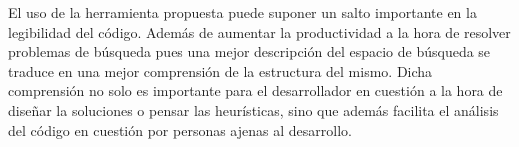 \begin{conclusions}
      El uso de la herramienta propuesta puede suponer un salto importante en la
      legibilidad del código. Además de aumentar la productividad a la hora de resolver problemas de
      búsqueda pues una mejor descripción del espacio de búsqueda se traduce en una mejor comprensión
      de la estructura del mismo. Dicha comprensión no solo es importante para el desarrollador en
      cuestión a la hora de diseñar la soluciones o pensar las heurísticas, sino que además facilita
      el análisis del código en cuestión por personas ajenas al desarrollo.
\end{conclusions}
